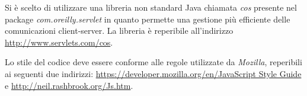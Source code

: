 Si \`e scelto di utilizzare una libreria non standard Java chiamata \textit{cos} presente nel package \textit{com.oreilly.servlet} in quanto permette una gestione pi\`u efficiente delle comunicazioni client-server. La libreria \`e reperibile all'indirizzo \href{http://www.servlets.com/cos}{http://www.servlets.com/cos}.
  


Lo stile del codice deve essere conforme alle regole utilizzate da \textit{Mozilla}, reperibili ai seguenti due indirizzi: \href{https://developer.mozilla.org/en/JavaScript_style_guide}{https://developer.mozilla.org/en/JavaScript Style Guide} e \href{http://neil.rashbrook.org/Js.htm}{http://neil.rashbrook.org/Js.htm}.

 
